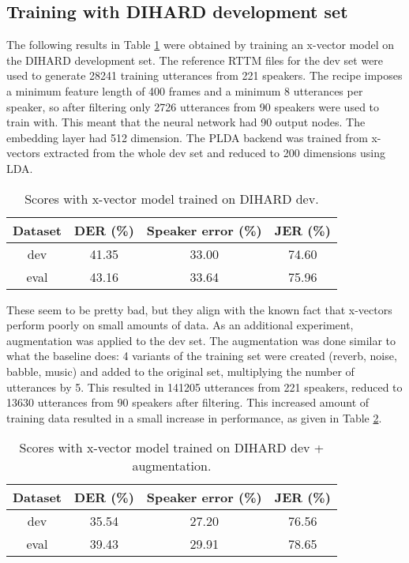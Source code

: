 		\subsection{Training with DIHARD development set}
			The following results in Table \ref{table-dev-xvec} were obtained by training an x-vector model on the DIHARD development set. The reference RTTM files for the dev set were used to generate 28241 training utterances from 221 speakers. The recipe imposes a minimum feature length of 400 frames and a minimum 8 utterances per speaker, so after filtering only 2726 utterances from 90 speakers were used to train with. This meant that the neural network had 90 output nodes. The embedding layer had 512 dimension. The PLDA backend was trained from x-vectors extracted from the whole dev set and reduced to 200 dimensions using LDA.
			\begin{table}[h]
				\centering
				\begin{tabular}{|c|c|c|c|}
					\hline
					Dataset & DER (\%) & Speaker error (\%) & JER (\%) \\
					\hline
					dev & 41.35 & 33.00 & 74.60 \\
					\hline
					eval & 43.16 & 33.64 & 75.96 \\
					\hline
				\end{tabular}
				\caption{Scores with x-vector model trained on DIHARD dev.}
				\label{table-dev-xvec}
			\end{table}
		
		These seem to be pretty bad, but they align with the known fact that x-vectors perform poorly on small amounts of data. As an additional experiment, augmentation was applied to the dev set. The augmentation was done similar to what the baseline does: 4 variants of the training set were created (reverb, noise, babble, music) and added to the original set, multiplying the number of utterances by 5. This resulted in 141205 utterances from 221 speakers, reduced to 13630 utterances from 90 speakers after filtering. This increased amount of training data resulted in a small increase in performance, as given in Table \ref{table-dev-xvec-aug}.
		
		\begin{table}[h]
			\centering
			\begin{tabular}{|c|c|c|c|}
				\hline
				Dataset & DER (\%) & Speaker error (\%) & JER (\%) \\
				\hline
				dev & 35.54 & 27.20 & 76.56 \\
				\hline
				eval & 39.43 & 29.91 & 78.65 \\
				\hline
			\end{tabular}
			\caption{Scores with x-vector model trained on DIHARD dev + augmentation.}
			\label{table-dev-xvec-aug}
		\end{table}
	
